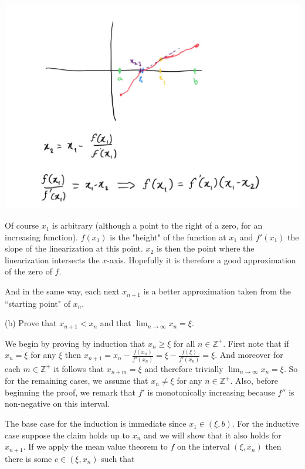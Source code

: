\documentclass{article}
\begin{document}
  \vspace{1cm}

  \includegraphics[scale=.2]{drawing.jpg}

  Of course $x_1$ is arbitrary (although a point to the right of a zero, for an increasing function).  $f(x_1)$ is the "height" of the function at $x_1$ and $f'(x_1)$ the slope of the linearization at this point.  $x_2$ is then the point where the linearization intersects the $x$-axis.  Hopefully it is therefore a good approximation of the zero of $f$.

  And in the same way, each next $x_{n+1}$ is a better approximation taken from the ``starting point" of $x_n$.

  \vspace{1cm}

  {\Large \color{Sepia} (b) Prove that $x_{n+1}<x_n$ and that $\lim_{n\to \infty}x_n=\xi$.}

  \vspace{1cm}

  We begin by proving by induction that $x_n \geq \xi$ for all $n\in\mathbb Z^+$.  First note that if $x_n=\xi$ for any $\xi$ then $x_{n+1}=x_n-\frac{f(x_n)}{f'(x_n)}=\xi - \frac{f(\xi)}{f'(x_n)} = \xi$.  And moreover for each $m\in\mathbb Z^+$ it follows that $x_{n+m}=\xi$ and therefore trivially $\displaystyle \lim_{n\to\infty}x_n=\xi$.  So for the remaining cases, we assume that $x_n\ne \xi$ for any $n\in\mathbb Z^+$.  Also, before beginning the proof, we remark that $f'$ is monotonically increasing because $f''$ is non-negative on this interval.

  The base case for the induction is immediate since $x_1\in(\xi,b)$.  For the inductive case suppose the claim holds up to $x_n$ and we will show that it also holds for $x_{n+1}$.  If we apply the mean value theorem to $f$ on the interval $(\xi, x_n)$ then there is some $c\in (\xi, x_n)$ such that
\end{document}
